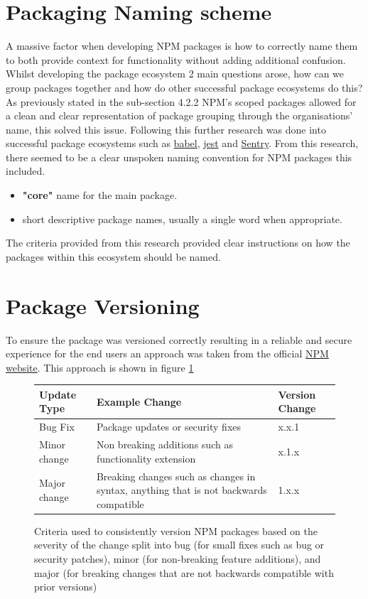 \documentclass{l4proj}
\begin{document}
\section{Packaging Naming scheme}
A massive factor when developing NPM packages is how to correctly name them to both provide context for functionality without adding additional confusion. Whilst developing the package ecosystem 2 main questions arose, how can we group packages together and how do other successful package ecosystems do this? As previously stated in the sub-section 4.2.2 NPM's scoped packages allowed for a clean and clear representation of package grouping through the organisations' name, this solved this issue. Following this further research was done into successful package ecosystems such as \href{https://babeljs.io/}{babel}, \href{https://jestjs.io/}{jest} and \href{https://sentry.io/welcome/}{Sentry}. From this research, there seemed to be a clear unspoken naming convention for NPM packages this included.
\begin{itemize}
    \item \textbf{"core"} name for the main package.
    \item short descriptive package names, usually a single word when appropriate.
\end{itemize}

The criteria provided from this research provided clear instructions on how the packages within this ecosystem should be named.

\section{Package Versioning}
To ensure the package was versioned correctly resulting in a reliable and secure experience for the end users an approach was taken from the official \href{https://docs.npmjs.com/about-semantic-versioning
}{NPM website}. This approach is shown in figure \ref{fig:NPM-versioning}

\begin{figure}[!ht]
    
\begin{center}
\begin{tabular}{|p{2.25cm}|p{7.25cm}|p{3.25cm}|}
 \hline
 \textbf{Update Type} & \textbf{Example Change} & \textbf{Version Change} \\
 \hline
 \hline
Bug Fix & Package updates or security fixes  &  x.x.1  \\
 \hline
Minor change & Non breaking additions such as functionality extension  &  x.1.x  \\
 \hline
Major change & Breaking changes such as changes in syntax, anything that is not backwards compatible  &  1.x.x  \\
 \hline
\end{tabular}
\end{center} 
    \caption{Criteria used to consistently version NPM packages based on the severity of the change split into bug (for small fixes such as bug or security patches), minor (for non-breaking feature additions), and major (for breaking changes that are not backwards compatible with prior versions)}
    \label{fig:NPM-versioning}
\end{figure}
\end{document}
